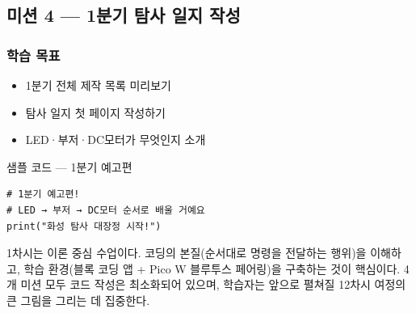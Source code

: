 \subsection{미션 4 --- 1분기 탐사 일지 작성}
\label{subsec:ch01-m4}

\begin{storybox}
\end{storybox}

\subsubsection*{학습 목표}
\begin{itemize}[leftmargin=1.4em]
  \item 1분기 전체 제작 목록 미리보기
  \item 탐사 일지 첫 페이지 작성하기
  \item LED·부저·DC모터가 무엇인지 소개
\end{itemize}

\begin{labbox}{샘플 코드 --- 1분기 예고편}
\begin{verbatim}
# 1분기 예고편!
# LED → 부저 → DC모터 순서로 배울 거예요
print("화성 탐사 대장정 시작!")
\end{verbatim}
\end{labbox}

\begin{summary}[1차시 요약]
1차시는 이론 중심 수업이다. 코딩의 본질(순서대로 명령을 전달하는 행위)을
이해하고, 학습 환경(블록 코딩 앱 + Pico W 블루투스 페어링)을 구축하는
것이 핵심이다. 4개 미션 모두 코드 작성은 최소화되어 있으며, 학습자는
앞으로 펼쳐질 12차시 여정의 큰 그림을 그리는 데 집중한다.
\end{summary}
